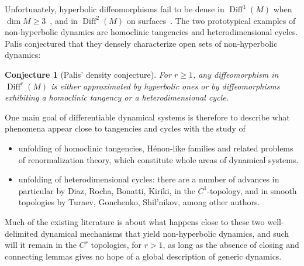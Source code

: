 \documentclass[11pt, a4paper]{amsart}
\theoremstyle{plain}
\newtheorem{conjecture}{Conjecture}[proposition]
\theoremstyle{definition}
\theoremstyle{remark}
\numberwithin{equation}{section}         %
\DeclareMathOperator{\Diff}{{Diff}}
\def\Diff{\operatorname{Diff}}
\def\Orb{\operatorname{Orb}}
\begin{document}
Unfortunately, hyperbolic diffeomorphisms fail to be dense in $\Diff^1(M)$ when $\dim M\geq 3$~\cite{AS}, and in $\Diff^2(M)$ on surfaces~\cite{N1}. The two prototypical examples of non-hyperbolic dynamics are homoclinic tangencies and heterodimensional cycles.
Palis conjectured that they densely characterize open sets of non-hyperbolic dynamics:

\begin{conjecture}[Palis' density conjecture]
For $r\geq 1$, any diffeomorphism in $\Diff^r(M)$ is either approximated by hyperbolic ones or by diffeomorphisms exhibiting a homoclinic tangency or a heterodimensional cycle.
\end{conjecture}

One main goal of differentiable dynamical systems is therefore to describe what phenomena appear close to tangencies and cycles with the study of
\begin{itemize}
\item unfolding of homoclinic tangencies, H\'enon-like families and related problems of renormalization theory, which constitute whole areas of dynamical systems. 

\item unfolding of heterodimensional cycles: there are a number of advances in particular by Diaz, Rocha, Bonatti, Kiriki, in the $C^1$-topology, and in smooth topologies by Turaev, Gonchenko, Shil'nikov, among other authors.


%
\end{itemize}

Much of the existing literature is about what happens close to these two well-delimited dynamical mechanisms that yield non-hyperbolic dynamics, and such will it remain in the $C^r$ topologies, for $r>1$, as long as the absence of closing and connecting lemmas gives no hope of a global description of generic dynamics.
\end{document}
